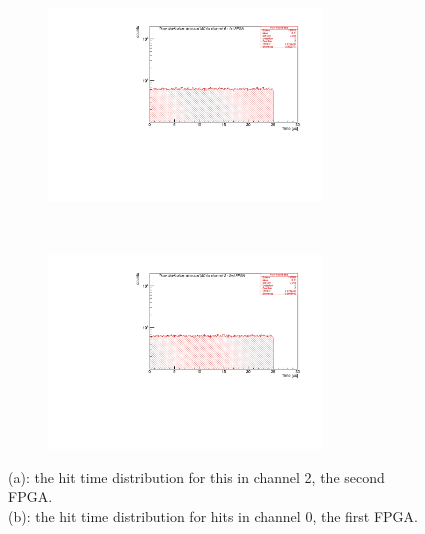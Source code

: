 \begin{figure}[!h]
  \begin{subfigure}[b]{\textwidth}
      \centering
      \includegraphics[width=0.8\textwidth]{figures/pdf/figure_00001_timedistr_roc_simulation_10538.pdf}
      \caption{}
      \label{fig:ttt1}
  \end{subfigure}
\\
  \begin{subfigure}[b]{\textwidth}
      \centering
      \includegraphics[width=0.8\textwidth]{figures/pdf/figure_00012_timedistr_roc_simulation_ch2_105038.pdf}
      \caption{}
      \label{fig:ttt2}
  \end{subfigure}
     \caption{(a): the hit time distribution for this in channel 2, the second FPGA. 
     \\
     (b): the hit time distribution for hits in channel 0, the first FPGA.}
     \label{fig:4}
\end{figure}

